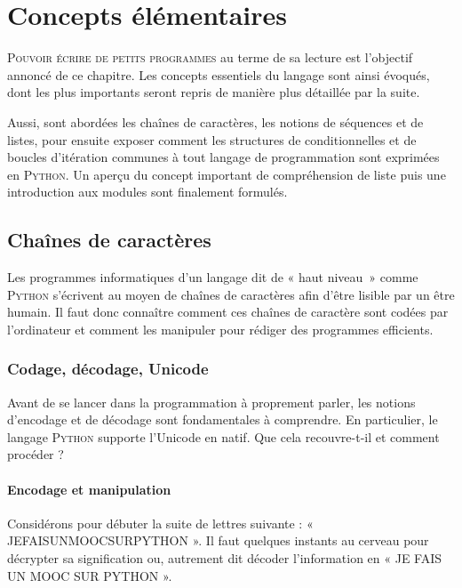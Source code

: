 \chapter[Concepts élémentaires]{Concepts élémentaires}
\label{chap:XI}


\lettrine[lhang=0.05]{P}{ouvoir écrire de petits programmes} au terme de sa lecture est l'objectif annoncé de ce chapitre. Les concepts essentiels du langage sont ainsi évoqués, dont les plus importants seront repris de manière plus détaillée par la suite.

Aussi, sont abordées les chaînes de caractères, les notions de séquences et de listes, pour ensuite exposer comment les structures de conditionnelles et de boucles d'itération communes à tout langage de programmation sont exprimées en \textsc{Python}. Un aperçu du concept important de compréhension de liste puis une introduction aux modules sont finalement formulés.

\section[Chaînes de caractères]{Chaînes de caractères}
\label{sec:XI.1}

Les programmes informatiques d'un langage dit de « haut niveau~» comme \textsc{Python} s'écrivent au moyen de chaînes de caractères afin d'être lisible par un être humain. Il faut donc connaître comment ces chaînes de caractère sont codées par l'ordinateur et comment les manipuler pour rédiger des programmes efficients.

\subsection[Codage, décodage, Unicode]{Codage, décodage, Unicode}
\label{sub:XI.1.1}

Avant de se lancer dans la programmation à proprement parler, les notions d'encodage et de décodage sont fondamentales à comprendre. En particulier, le langage \textsc{Python} supporte l'Unicode en natif. Que cela recouvre-t-il et comment procéder ?

\subsubsection[Encodage et manipulation]{Encodage et manipulation}
\label{subsub:XI.1.1.1}

Considérons pour débuter la suite de lettres suivante : « JEFAISUNMOOCSURPYTHON ». Il faut quelques instants au cerveau pour décrypter sa signification ou, autrement dit décoder l'information en « JE FAIS UN MOOC SUR PYTHON ».

